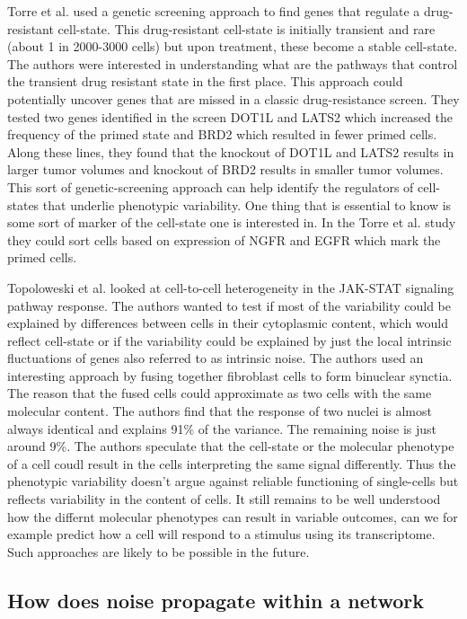Torre et al. \cite{Torre} used a genetic screening approach to find genes that regulate a drug-resistant cell-state. This drug-resistant cell-state is initially transient and rare (about 1 in 2000-3000 cells) but upon treatment, these become a stable cell-state.  The authors were interested in understanding what are the pathways that control the transient drug resistant state in the first place. This approach could potentially uncover genes that are missed in a classic drug-resistance screen. They tested two genes identified in the screen DOT1L and LATS2 which increased the frequency of the primed state and BRD2 which resulted in fewer primed cells. Along these lines, they found that the knockout of DOT1L and LATS2 results in larger tumor volumes and knockout of BRD2 results in smaller tumor volumes. This sort of genetic-screening approach can help identify the regulators of cell-states that underlie phenotypic variability. One thing that is essential to know is some sort of marker of the cell-state one is interested in. In the Torre et al. study they could sort cells based on expression of NGFR and EGFR which mark the primed cells.

Topoloweski et al. \cite{Topolweski} looked at cell-to-cell heterogeneity in the JAK-STAT signaling pathway response. The authors wanted to test if most of the variability could be explained by differences between cells in their cytoplasmic content, which would reflect cell-state or if the variability could be explained by just the local intrinsic fluctuations of genes also referred to as intrinsic noise. The authors used an interesting approach by fusing together fibroblast cells to form binuclear synctia. The reason that the fused cells could approximate as two cells with the same molecular content. The authors find that the response of two nuclei is almost always identical and explains 91\% of the variance. The remaining noise is just around 9\%. The authors speculate that the cell-state or the molecular phenotype of a cell coudl result in the cells interpreting the same signal differently. Thus the phenotypic variability doesn't argue against reliable functioning of single-cells but reflects variability in the content of cells. It still remains to be well understood how the differnt molecular phenotypes can result in variable outcomes, can we for example predict how a cell will respond to a stimulus using its transcriptome. Such approaches are likely to be possible in the future.

\subsection{ How does noise propagate within a network}


